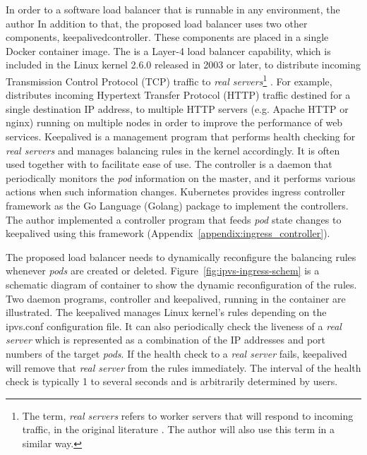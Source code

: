 In order to  a software load balancer that is runnable in any environment, the author 
In addition to that, the proposed load balancer uses two other components, keepalivedcontroller.
These components are placed in a single Docker container image.
The  is a Layer-4 load balancer capability, which is included in the Linux kernel 2.6.0 released in 2003 or later,
to distribute incoming Transmission Control Protocol (TCP) traffic to
{\em real servers}\footnote{The term, {\em real servers} refers to worker servers that will respond to incoming traffic,
in the original literature \cite{Zhang2000}. The author will also use this term in a similar way.} \cite{Zhang2000}.
For example,  distributes incoming Hypertext Transfer Protocol (HTTP) traffic destined for a single destination IP address,
to multiple HTTP servers (e.g. Apache HTTP or nginx) running on multiple nodes in order to improve the performance of web services.
Keepalived is a management program that performs health checking for {\em real servers}
and manages  balancing rules in the kernel accordingly.
It is often used together with  to facilitate ease of use.
The controller is a daemon that periodically monitors the {\em pod} information on the master,
and it performs various actions when such information changes.
Kubernetes provides ingress controller framework as the Go Language (Golang) package to implement the controllers.
The author implemented a controller program that feeds {\em pod} state changes to keepalived
using this framework (Appendix~\ref{appendix:ingress_controller}).

The proposed load balancer needs to dynamically reconfigure the  balancing rules whenever {\em pods} are created or deleted. 
Figure~\ref{fig:ipvs-ingress-schem} is a schematic diagram of  container to show the dynamic reconfiguration of the  rules.
Two daemon programs, controller and keepalived, running in the container are illustrated.
The keepalived manages Linux kernel's  rules depending on the ipvs.conf configuration file.
It can also periodically check the liveness of a {\em real server}
%
which is represented as a combination of the IP addresses and port numbers of the target {\em pods}. 
If the health check to a {\em real server} fails, keepalived will remove that {\em real server} from the  rules immediately.
The interval of the health check is typically 1 to several seconds and is arbitrarily determined by users.  

